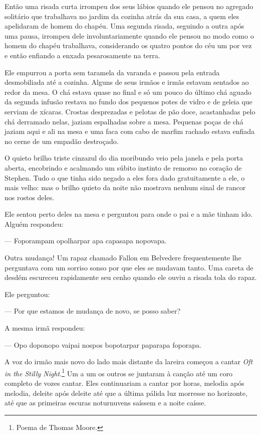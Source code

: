 Então uma risada curta irrompeu dos seus lábios quando ele pensou no
agregado solitário que trabalhava no jardim da cozinha atrás da sua
casa, a quem eles apelidaram de homem do chapéu. Uma segunda risada,
seguindo a outra após uma pausa, irrompeu dele involuntariamente quando
ele pensou no modo como o homem do chapéu trabalhava, considerando os
quatro pontos do céu um por vez e então enfiando a enxada pesarosamente
na terra.

Ele empurrou a porta sem taramela da varanda e passou pela entrada
desmobiliada até a cozinha. Alguns de seus irmãos e irmãs estavam
sentados ao redor da mesa. O chá estava quase no final e só um pouco do
último chá aguado da segunda infusão restava no fundo dos pequenos
potes de vidro e de geleia que serviam de xícaras. Crostas desprezadas
e pelotas de pão doce, acastanhadas pelo chá derramado nelas, jaziam
espalhadas sobre a mesa. Pequenas poças de chá jaziam aqui e ali na
mesa e uma faca com cabo de marfim rachado estava enfiada no cerne de
um empadão destroçado.

O quieto brilho triste cinzazul do dia moribundo veio pela janela e pela
porta aberta, encobrindo e acalmando um súbito instinto de remorso no
coração de Stephen. Tudo o que tinha sido negado a eles fora dado
gratuitamente a ele, o mais velho: mas o brilho quieto da noite não
mostrava nenhum sinal de rancor nos rostos deles.

Ele sentou perto deles na mesa e perguntou para onde o pai e a mãe
tinham ido. Alguém respondeu:

 --- Foporampam opolharpar apa capasapa nopovapa.

Outra mudança! Um rapaz chamado Fallon em Belvedere frequentemente lhe
perguntava com um sorriso sonso por que eles se mudavam tanto. Uma
careta de desdém  escureceu rapidamente seu cenho quando ele ouviu a
risada tola do rapaz.

Ele perguntou:

 --- Por que estamos de mudança de novo, se posso saber?

A mesma irmã respondeu:

 --- Opo doponopo vaipai nospos bopotarpar paparapa foporapa.

A voz do irmão mais novo do lado mais distante da lareira começou a
cantar \textit{Oft in the Stilly Night}.\footnote{ Poema de Thomas Moore.} Um a um os outros se juntaram 
à canção até um coro completo de vozes cantar. Eles continuariam a
cantar por horas, melodia após melodia, deleite após deleite até que a
última pálida luz morresse no horizonte, até que as primeiras escuras
noturnuvens saíssem e a noite caísse.                                   

